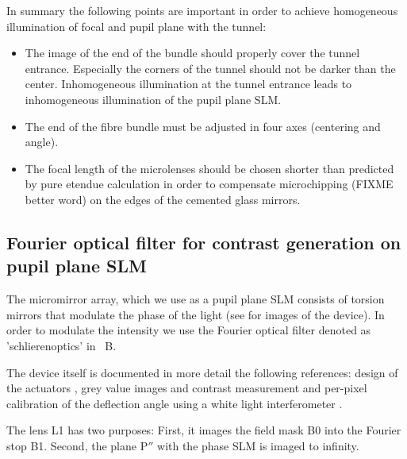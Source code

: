 In summary the following points are important in order to achieve
homogeneous illumination of focal and pupil plane with the tunnel:
\begin{itemize}
\item The image of the end of the bundle should properly cover the
  tunnel entrance. Especially the corners of the tunnel should not be
  darker than the center. Inhomogeneous illumination at the tunnel
  entrance leads to inhomogeneous illumination of the pupil plane SLM.
\item The end of the fibre bundle must be adjusted in four axes
  (centering and angle).
\item The focal length of the microlenses should be chosen shorter
  than predicted by pure etendue calculation in order to compensate
  microchipping (FIXME better word) on the edges of the cemented glass
  mirrors.
\end{itemize}

\subsection{Fourier optical filter for contrast generation on pupil
  plane SLM}
\label{ref:mma}
The micromirror array, which we use as a pupil plane SLM consists of
torsion mirrors that modulate the phase of the light (see
 for images of the device). In order to modulate the
intensity we use the Fourier optical filter denoted as
'schlierenoptics' in ~B.

The device itself is documented in more detail the following
references: design of the actuators \citep{Schmidt2010}, grey value
images and contrast measurement \citep{Berndt2010} and per-pixel
calibration of the deflection angle using a white light interferometer
\citep{Berndt2011,Berndt2007}.


The lens L1 has two purposes: First, it images the field mask B0 into %
the Fourier stop B1. Second, the plane $\textrm{P}''$ with the phase
SLM is imaged to infinity.

